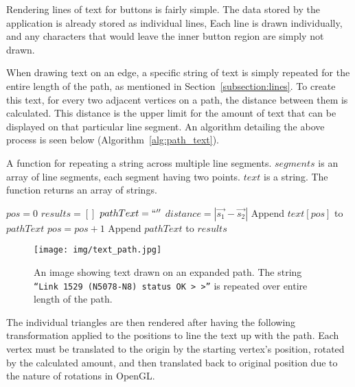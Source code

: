 Rendering lines of text for buttons is fairly simple. The data stored by the application is 
already stored as individual lines, Each line is drawn individually, and any characters that 
would leave the inner button region are simply not drawn.

When drawing text on an edge, a specific string of text is simply repeated for the entire length of the path, as mentioned in Section~\ref{subsection:lines}. To create this text, for every two adjacent vertices on a path, the distance between them is calculated. This distance is the upper limit for the amount of text that can be displayed on that particular line segment. An algorithm detailing the above process is seen below (Algorithm~\ref{alg:path_text}).

\begin{algorithm}
    \caption{A function for repeating a string across multiple line segments. $segments$ is an array of
    line segments, each segment having two points. $text$ is a string. The function returns an array of
    strings.}
    \label{alg:path_text}
    \begin{algorithmic}[1]
            \State $pos = 0$
            \State $results = []$
                \State $pathText = ``''$
                \State $distance = |\vec{s_1} - \vec{s_2}|$
                    \State Append $text[pos]$ to $pathText$
                    \State $pos = pos + 1$
                \EndWhile
                \State Append $pathText$ to $results$
            \EndFor 
            \State {}
        \EndFunction
    \end{algorithmic}
\end{algorithm}

\begin{figure}[htp] \centering
    \texttt{[image: img/text\_path.jpg]}
    \caption[Text Drawn on a Path]{An image showing text drawn on an expanded path. The string {\tt ``Link 1529 (N5078-N8) status OK > >''} is repeated over entire length of the path.}
    \label{fig:text_path}
\end{figure}

The individual triangles are then rendered after having the following transformation applied to the positions to line the text up with the path. Each vertex must be translated to the origin by the starting vertex's position, rotated by the calculated amount, and then translated back to original position due to the nature of rotations in OpenGL\@. 


